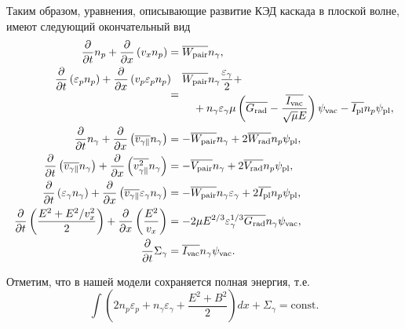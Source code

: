 Таким образом, уравнения, описывающие развитие КЭД каскада в плоской волне, имеют следующий окончательный вид
\begin{align}
    \label{eq:ch2/fin1}
    \frac{\partial }{\partial t}n_p  +\frac{\partial}{\partial x}\left( v_x n_p \right) &= \overline{W_\mathrm{pair}} n_\gamma  ,\\
    \label{eq:ch2/fin2}
    \phantom{abs} &= 
    \begin{multlined}[c]
        \mathllap{\frac{\partial}{\partial t}\left( \varepsilon_p n_p \right)  + \frac{\partial}{\partial x}\left( v_p \varepsilon_p n_p \right) \quad}
        \overline{W_\mathrm{pair}} n_\gamma \frac{\varepsilon_\gamma}{2}  + \\
        + n_\gamma\varepsilon_\gamma  \mu \left( \overline{G_\mathrm{rad}} - \frac{\overline{I_\mathrm{vac}}}{\sqrt{\mu} E}  \right) \psi_\mathrm{vac} - \overline{I_\mathrm{pl}} n_p \psi_\mathrm{pl} ,
    \end{multlined} \\
    \label{eq:ch2/fin3}
    \frac{\partial }{\partial t}n_\gamma  +\frac{\partial}{\partial x}\left( \overline{v_{\gamma\parallel}} n_\gamma \right)&=-\overline{W_\mathrm{pair}} n_\gamma + 2\overline{W_\mathrm{rad}} n_p \psi_\mathrm{pl} ,\\
    \label{eq:ch2/fin4}
    \frac{\partial}{\partial t}\left( \overline{v_{\gamma\parallel}} n_\gamma \right) + \frac{\partial}{\partial x}\left( \overline{v_{\gamma\parallel}^2} n_\gamma \right) &= -\overline{V_\mathrm{pair}} n_\gamma + 2 \overline{V_\mathrm{rad}} n_p \psi_\mathrm{pl} ,\\
    \label{eq:ch2/fin5}
    \frac{\partial}{\partial t}\left( \varepsilon_\gamma n_\gamma \right) +\frac{\partial}{\partial x}\left( \overline{v_{\gamma\parallel}} \varepsilon_\gamma n_\gamma \right) &=-\overline{W_\mathrm{pair}}n_\gamma\varepsilon_\gamma   +2 \overline{I_\mathrm{pl}} n_p \psi_\mathrm{pl} ,\\
    \label{eq:ch2/fin6}
    \frac{\partial }{\partial t}\left( \frac{E^2 + E^2/v_x^2}{2} \right) +\frac{\partial}{\partial x} \left( \frac{E^2}{v_x} \right) &=  -2\mu E^{2/3}\varepsilon_\gamma^{1/3}\overline{G_\mathrm{rad}} n_\gamma\psi_\mathrm{vac}  ,\\
    \label{eq:ch2/fin7}
    \frac{\partial }{\partial t}\Sigma_\gamma &=  \overline{I_\mathrm{vac}} n_\gamma \psi_\mathrm{vac} .
\end{align}

Отметим, что в нашей модели сохраняется полная энергия, т.е.
\begin{equation}
    \int \left( 2n_p\varepsilon_p + n_\gamma \varepsilon_\gamma + \frac{E^2 + B^2}{2} \right) dx + \Sigma_\gamma = \text{const} .
\end{equation}


